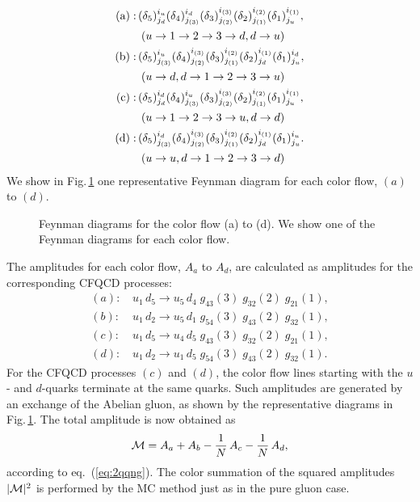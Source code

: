 \begin{subequations}
\begin{align}
 {\rm (a)}:\,&(\delta_5)^{i_u}_{j_d}(\delta_4)^{i_d}_{j_{(3)}}(\delta_3)^{i_{(3)}}_{j_{(2)}}(\delta_2)^{i_{(2)}}_{j_{(1)}}(\delta_1)^{i_{(1)}}_{j_u},\\
 &\;(u\rightarrow 1\rightarrow 2\rightarrow 3\rightarrow d, d\rightarrow u)\nonumber\\
 {\rm (b)}:\,&(\delta_5)^{i_u}_{j_{(3)}}(\delta_4)^{i_{(3)}}_{j_{(2)}}(\delta_3)^{i_{(2)}}_{j_{(1)}}(\delta_2)^{i_{(1)}}_{j_d}(\delta_1)^{i_d}_{j_u},\\
 &\;(u\rightarrow d, d\rightarrow 1\rightarrow 2\rightarrow
 3\rightarrow u)\nonumber\\
 {\rm (c)}:\,&(\delta_5)^{i_d}_{j_d}(\delta_4)^{i_u}_{j_{(3)}}(\delta_3)^{i_{(3)}}_{j_{(2)}}(\delta_2)^{i_{(2)}}_{j_{(1)}}(\delta_1)^{i_{(1)}}_{j_u},\\
 &\;(u\rightarrow 1\rightarrow 2\rightarrow 3\rightarrow u, d\rightarrow d)\nonumber\\
 {\rm (d)}:\,&(\delta_5)^{i_d}_{j_{(3)}}(\delta_4)^{i_{(3)}}_{j_{(2)}}(\delta_3)^{i_{(2)}}_{j_{(1)}}(\delta_2)^{i_{(1)}}_{j_d}(\delta_1)^{i_u}_{j_u}.\\
 &\;(u\rightarrow u, d\rightarrow 1\rightarrow 2\rightarrow
 3\rightarrow d)\nonumber
\end{align}
\end{subequations}
We show in Fig.\,\ref{fig:abcd} one representative Feynman diagram for
each color flow, $(a)$ to $(d)$.
\begin{figure}
\caption{Feynman diagrams for the color flow (a) to (d). We show one of the
 Feynman diagrams for each color flow.}
\label{fig:abcd}
\end{figure}
The amplitudes for each color flow, $A_a$ to $A_d$, are calculated as
amplitudes for the corresponding CFQCD processes:
\begin{subequations}
\begin{align}
 (a):&\,u_1\,d_5\rightarrow u_5\,d_4 \;g_{43}(3) \;g_{32}(2) \;g_{21}(1),\\
 (b):&\,u_1\,d_2\rightarrow u_5\,d_1 \;g_{54}(3) \;g_{43}(2) \;g_{32}(1),\\
 (c):&\,u_1\,d_5\rightarrow u_4\,d_5 \;g_{43}(3) \;g_{32}(2) \;g_{21}(1),\\
 (d):&\,u_1\,d_2\rightarrow u_1\,d_5 \;g_{54}(3) \;g_{43}(2) \;g_{32}(1).
\end{align}
\end{subequations}
For the CFQCD processes $(c)$ and $(d)$, the color flow lines starting
with the $u$- and $d$-quarks terminate at the same quarks. Such amplitudes are generated
by an exchange of the Abelian gluon, as shown by the
representative diagrams in Fig.\,\ref{fig:abcd}. The total amplitude is
now obtained as
\begin{equation}
 {\cal M}=A_a+A_b-\frac{1}{N}\,A_c-\frac{1}{N}\,A_d,
\end{equation}
according to eq.~(\ref{eq:2qqng}). The color summation of the squared
amplitudes $|{\cal M}|^2$ is performed by the MC method just as in the pure gluon case.

